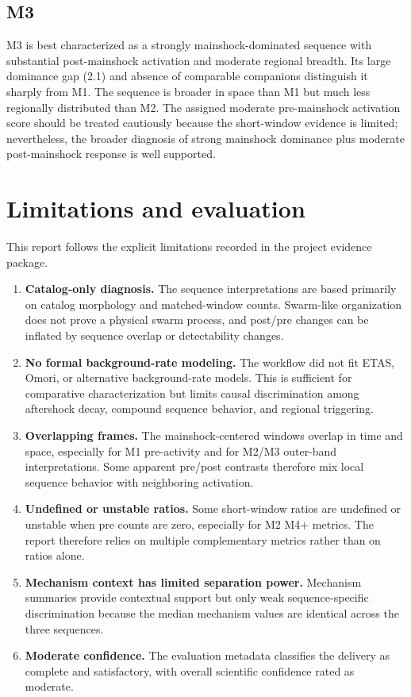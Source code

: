 \documentclass[11pt]{article}
\begin{document}
\subsection{M3}
M3 is best characterized as a strongly mainshock-dominated sequence with substantial post-mainshock activation and moderate regional breadth. Its large dominance gap (2.1) and absence of comparable companions distinguish it sharply from M1. The sequence is broader in space than M1 but much less regionally distributed than M2. The assigned moderate pre-mainshock activation score should be treated cautiously because the short-window evidence is limited; nevertheless, the broader diagnosis of strong mainshock dominance plus moderate post-mainshock response is well supported.

\section{Limitations and evaluation}
This report follows the explicit limitations recorded in the project evidence package.
\begin{enumerate}[leftmargin=1.5em]
    \item \textbf{Catalog-only diagnosis.} The sequence interpretations are based primarily on catalog morphology and matched-window counts. Swarm-like organization does not prove a physical swarm process, and post/pre changes can be inflated by sequence overlap or detectability changes.
    \item \textbf{No formal background-rate modeling.} The workflow did not fit ETAS, Omori, or alternative background-rate models. This is sufficient for comparative characterization but limits causal discrimination among aftershock decay, compound sequence behavior, and regional triggering.
    \item \textbf{Overlapping frames.} The mainshock-centered windows overlap in time and space, especially for M1 pre-activity and for M2/M3 outer-band interpretations. Some apparent pre/post contrasts therefore mix local sequence behavior with neighboring activation.
    \item \textbf{Undefined or unstable ratios.} Some short-window ratios are undefined or unstable when pre counts are zero, especially for M2 M4+ metrics. The report therefore relies on multiple complementary metrics rather than on ratios alone.
    \item \textbf{Mechanism context has limited separation power.} Mechanism summaries provide contextual support but only weak sequence-specific discrimination because the median mechanism values are identical across the three sequences.
    \item \textbf{Moderate confidence.} The evaluation metadata classifies the delivery as complete and satisfactory, with overall scientific confidence rated as moderate.
\end{enumerate}
\end{document}
